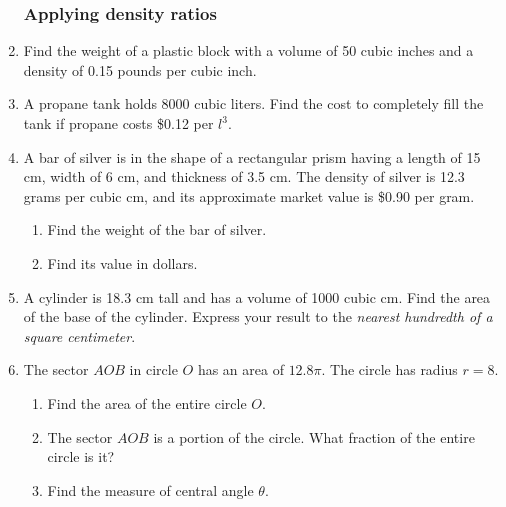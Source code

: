 \documentclass[12pt, twoside]{article}
\begin{document}
\begin{enumerate}
\subsubsection*{Applying density ratios}
  \item Find the weight of a plastic block with a volume of 50 cubic inches and a density of 0.15 pounds per cubic inch. \vspace{3cm}
  \item A propane tank holds 8000 cubic liters. Find the cost to completely fill the tank if propane costs \$0.12 per $l^3$. \vspace{2cm}
  \item A bar of silver is in the shape of a rectangular prism having a length of 15 cm, width of 6 cm, and thickness of 3.5 cm. The density of silver is 12.3 grams per cubic cm, and its approximate market value is \$0.90 per gram.
  \begin{enumerate}
    \item Find the weight of the bar of silver.  \vspace{3cm}
    \item Find its value in dollars.
  \end{enumerate} \vspace{2cm}

  \item A cylinder is 18.3 cm tall and has a volume of 1000 cubic cm. Find the area of the base of the cylinder. Express your result to the \emph{nearest hundredth of a square centimeter}. \vspace{3cm}


\newpage
  \item The sector $AOB$ in circle $O$ has an area of $12.8\pi$. The circle has radius $r=8$.
      \begin{multicols}{2}
      \raggedcolumns
      \begin{enumerate}
        \item Find the area of the entire circle $O$. \vspace{2cm}
        \item The sector $AOB$ is a portion of the circle. What fraction of the entire circle is it? \vspace{1.5cm}
        \item Find the measure of central angle $\theta$.
      \end{enumerate}
      \end{multicols}  \vspace{3cm}


\end{enumerate}
\end{document}
